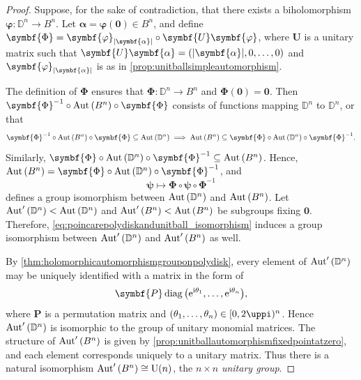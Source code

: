 \begin{proof}
    Suppose, for the sake of contradiction, that there exists a biholomorphism \(\symbf{\varphi}:\mathbb{D}^n\to B^n\). Let \(\symbf{\alpha}=\symbf{\varphi}(\symbf{0})\in B^n\), and define \(\symbf{\Phi}=\symbf{\varphi}_{\abs{\symbf{\alpha}}}\circ\symbf{U}\symbf{\varphi}\), where \(\symbf{U}\) is a unitary matrix such that \(\symbf{U}\symbf{\alpha}=\qty(\abs{\symbf{\alpha}},0,\ldots,0)\) and \(\symbf{\varphi}_{\abs{\symbf{\alpha}}}\) is as in \cref{prop:unitballsimpleautomorphism}.

    The definition of \(\symbf{\Phi}\) ensures that \(\symbf{\Phi}:\mathbb{D}^n\to B^n\) and \(\symbf{\Phi}(\symbf{0})=\symbf{0}\). Then \(\symbf{\Phi}^{-1}\circ\Aut\qty(B^n)\circ\symbf{\Phi}\) consists of functions mapping \(\mathbb{D}^n\) to \(\mathbb{D}^n\), or that \[\symbf{\Phi}^{-1}\circ\Aut\qty(B^n)\circ\symbf{\Phi}\subseteq\Aut\qty(\mathbb{D}^n)\implies\Aut\qty(B^n)\subseteq\symbf{\Phi}\circ\Aut\qty(\mathbb{D}^n)\circ\symbf{\Phi}^{-1}.\]
    Similarly, \(\symbf{\Phi}\circ\Aut\qty(\mathbb{D}^n)\circ\symbf{\Phi}^{-1}\subseteq\Aut\qty(B^n)\). Hence, \(\Aut\qty(B^n)=\symbf{\Phi}\circ\Aut\qty(\mathbb{D}^n)\circ\symbf{\Phi}^{-1}\), and
    \begin{equation}
        \symbf{\psi}\mapsto\symbf{\Phi}\circ\symbf{\psi}\circ\symbf{\Phi}^{-1}\label{eq:poincarepolydiskandunitball_isomorphism}
    \end{equation} defines a group isomorphism between \(\operatorname{Aut}\qty(\mathbb{D}^n)\) and \(\operatorname{Aut}\qty(B^n)\). Let \(\operatorname{Aut}'\qty(\mathbb{D}^n)<\operatorname{Aut}\qty(\mathbb{D}^n)\) and \(\operatorname{Aut}'\qty(B^n)<\operatorname{Aut}\qty(B^n)\) be subgroups fixing \(\symbf{0}\). Therefore, \cref{eq:poincarepolydiskandunitball_isomorphism} induces a group isomorphism between \(\operatorname{Aut}'\qty(\mathbb{D}^n)\) and \(\operatorname{Aut}'\qty(B^n)\) as well.

    By \cref{thm:holomorphicautomorphismgrouponpolydisk}, every element of \(\operatorname{Aut}'\qty(\mathbb{D}^n)\) may be uniquely identified with a matrix in the form of \[\symbf{P}\operatorname{diag}\qty(\ee^{\ii\theta_1},\ldots,\ee^{\ii\theta_n}),\] where \(\symbf{P}\) is a permutation matrix and \(\qty(\theta_1,\ldots,\theta_n)\in[0,2\uppi)^n\). Hence \(\operatorname{Aut}'\qty(\mathbb{D}^n)\) is isomorphic to the group of unitary monomial matrices. The structure of \(\operatorname{Aut}'\qty(B^n)\) is given by \cref{prop:unitballautomorphismfixedpointatzero}, and each element corresponds uniquely to a unitary matrix. Thus there is a natural isomorphism \(\operatorname{Aut}'\qty(B^n)\cong\mathrm{U}(n)\), the \(n\times n\) \textit{unitary group}.


\end{proof}
